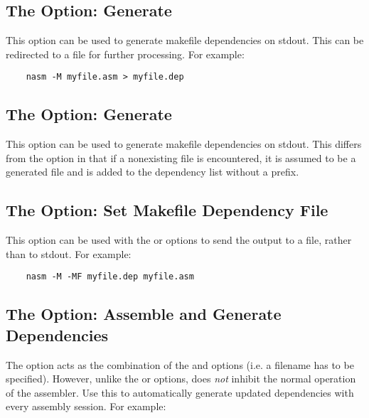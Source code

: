 \subsection{The  Option: Generate }
\label{subsec:opt-M-cap}

This option can be used to generate makefile dependencies on stdout.
This can be redirected to a file for further processing. For example:

\begin{lstlisting}
	nasm -M myfile.asm > myfile.dep
\end{lstlisting}

\subsection{The  Option: Generate }
\label{subsec:opt-MG-cap}

This option can be used to generate makefile dependencies on stdout.
This differs from the  option in that if a nonexisting file is
encountered, it is assumed to be a generated file and is added to the
dependency list without a prefix.

\subsection{The  Option: Set Makefile Dependency File}
\label{subsec:opt-MF-cap}

This option can be used with the  or  options
to send the output to a file, rather than to stdout. For example:

\begin{lstlisting}
	nasm -M -MF myfile.dep myfile.asm
\end{lstlisting}

\subsection{The  Option: Assemble and Generate Dependencies}
\label{subsec:opt-MD-cap}

The  option acts as the combination of the 
and  options (i.e. a filename has to be specified).
However, unlike the  or  options, 
does \emph{not} inhibit the normal operation of the assembler.
Use this to automatically generate updated dependencies with
every assembly session. For example:

